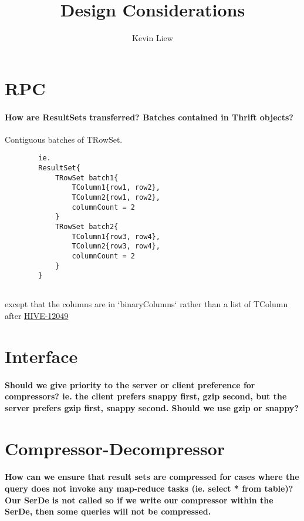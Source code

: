 \documentclass[11pt,a4paper]{article}
\title{Design Considerations}
\author{Kevin Liew}
\begin{document}
\maketitle

\section{RPC}
	
	\paragraph{How are ResultSets transferred? Batches contained in Thrift objects?}
	Contiguous batches of TRowSet.
	\begin{verbatim}
		ie.
		ResultSet{
		    TRowSet batch1{
		        TColumn1{row1, row2},
		        TColumn2{row1, row2},
		        columnCount = 2
		    }
		    TRowSet batch2{
		        TColumn1{row3, row4},
		        TColumn2{row3, row4},
		        columnCount = 2
		    }
		}
		
	\end{verbatim}
	except that the columns are in `binaryColumns` rather than a list of TColumn after \href{https://issues.apache.org/jira/browse/HIVE-12049}{HIVE-12049}

\section{Interface}
	
	\paragraph{Should we give priority to the server or client preference for compressors? ie. the client prefers snappy first, gzip second, but the server prefers gzip first, snappy second. Should we use gzip or snappy?}

\section{Compressor-Decompressor}

	\paragraph{How can we ensure that result sets are compressed for cases where the query does not invoke any map-reduce tasks (ie. select * from table)? Our SerDe is not called so if we write our compressor within the SerDe, then some queries will not be compressed.}\
	
\end{document}
